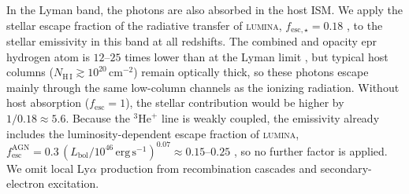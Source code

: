 \documentclass[apj,twocolumn, appendixfloats, twocolappendix, numberedappendix, tighten]{openjournal}
\DeclareRobustCommand{\lumina}{\mbox{\textsc{lumina}}\xspace}
\begin{document}
\begin{appendix}
In the  Lyman band, the photons are also absorbed in the host ISM. We apply the stellar escape fraction of the radiative transfer of \lumina, $f_{\mathrm{esc, \star}} = 0.18$ \citep{Zier2026}, to the stellar emissivity in this band at all redshifts. The combined  and  opacity epr hydrogen atom is $12$--$25$ times lower than at the Lyman limit \citep{Verner1996}, but typical host columns ($N_\mathrm{H\,I} \gtrsim 10^{20}\,\mathrm{cm^{-2}}$) remain optically thick, so these photons escape mainly through the same low-column channels as the ionizing radiation. Without host absorption ($f_\mathrm{esc}=1$), the stellar contribution would be higher by $1/0.18\approx5.6$. Because the $^{3}\mathrm{He}^{+}$ line is weakly coupled, the emissivity already includes the luminosity-dependent escape fraction of \lumina, $f_\mathrm{esc}^\mathrm{AGN} = 0.3\,(L_\mathrm{bol}/10^{46}\,\mathrm{erg\,s^{-1}})^{0.07} \approx 0.15\text{--}0.25$ \citep{Zier2026, Shen2026a}, so no further factor is applied. We omit local  Ly$\alpha$ production from  recombination cascades and secondary-electron excitation.





\end{appendix}
\end{document}
